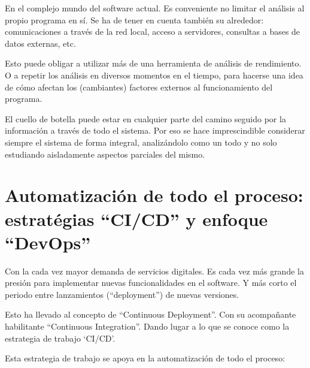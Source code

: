 \documentclass[spanish,12pt,a4paper,final,oneside]{book}
\begin{document}
En el complejo mundo del software actual. Es conveniente no limitar el análisis al propio programa en sí. Se ha de tener en cuenta  también su alrededor: comunicaciones a través de la red local, acceso a servidores, consultas a bases de datos externas, etc.

Esto puede obligar a utilizar más de una herramienta de análisis de rendimiento. O a repetir los análisis en diversos momentos en el tiempo, para hacerse una idea de cómo afectan los (cambiantes) factores externos al funcionamiento del programa.

El cuello de botella puede estar en cualquier parte del camino seguido por la información a través de todo el sistema. Por eso se hace imprescindible considerar siempre el sistema de forma integral, analizándolo como un todo y no solo estudiando aisladamente aspectos parciales del mismo.


\section{Automatización de todo el proceso:\\estratégias ``CI/CD'' y enfoque ``DevOps''}

Con la cada vez mayor demanda de servicios digitales. Es cada vez más grande la presión para implementar nuevas funcionalidades en el software. Y más corto el periodo entre lanzamientos (``deployment'') de nuevas versiones.

Esto ha llevado al concepto de ``Continuous Deployment''. Con su acompañante habilitante ``Continuous Integration''. Dando lugar a lo que se conoce como la estrategia de trabajo `CI/CD'.

Esta estrategia de trabajo se apoya en la automatización de todo el proceso:
\end{document}
